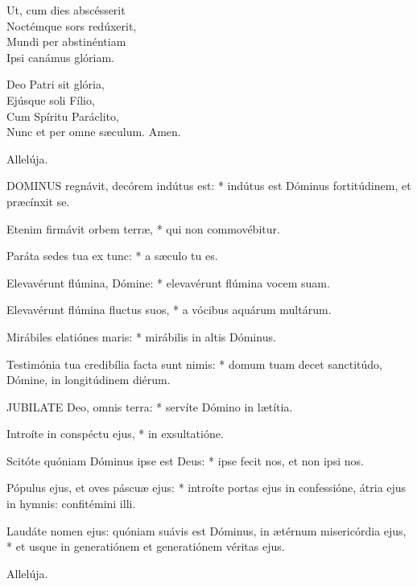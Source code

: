 Ut, cum dies abscésserit\\
Noctémque sors redúxerit,\\
Mundi per abstinéntiam\\
Ipsi canámus glóriam.

Deo Patri sit glória,\\
Ejúsque soli Fílio,\\
Cum Spíritu Paráclito,\\
Nunc et per omne sæculum. Amen.

 Allelúja.



\lettrine[lines=2]{D}{OMINUS} regnávit, decórem indútus est: * indútus est Dóminus fortitúdinem, et præcínxit se.

Etenim firmávit orbem terræ, * qui non commovébitur.

Paráta sedes tua ex tunc: * a sæculo tu es.

Elevavérunt flúmina, Dómine: * elevavérunt flúmina vocem suam.

Elevavérunt flúmina fluctus suos, * a vócibus aquárum multárum.

Mirábiles elatiónes maris: * mirábilis in altis Dóminus.

Testimónia tua credibília facta sunt nimis: * domum tuam decet sanctitúdo, Dómine, in longitúdinem diérum.


\lettrine[lines=2]{J}{UBILATE} Deo, omnis terra: * servíte Dómino in lætítia.

Introíte in conspéctu ejus, * in exsultatióne.

Scitóte quóniam Dóminus ipse est Deus: * ipse fecit nos, et non ipsi nos.

Pópulus ejus, et oves páscuæ ejus: * introíte portas ejus in confessióne, átria ejus in hymnis: confitémini illi.

Laudáte nomen ejus: quóniam suávis est Dóminus, in ætérnum misericórdia ejus, * et usque in generatiónem et generatiónem véritas ejus.


 Allelúja.


